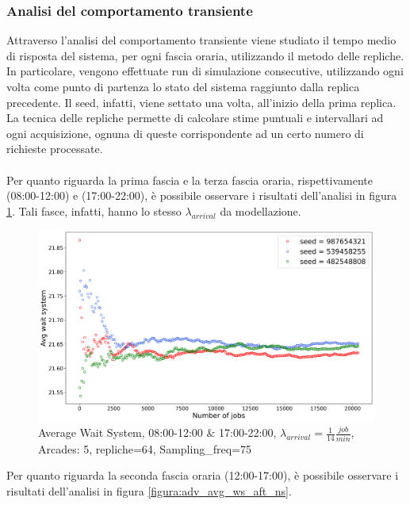 \documentclass{article}
\begin{document}
\subsubsection{Analisi del comportamento transiente}
Attraverso l'analisi del comportamento transiente viene studiato il tempo medio di risposta del sistema, per ogni fascia oraria, utilizzando il metodo delle repliche.
In particolare, vengono effettuate run di simulazione
consecutive, utilizzando ogni volta come punto di partenza lo stato del sistema raggiunto dalla replica precedente. Il seed, infatti, viene settato una volta, all'inizio della prima replica.
La tecnica delle repliche permette di calcolare stime puntuali e intervallari ad ogni acquisizione, ognuna di queste corrispondente ad un certo numero di richieste processate.
\\ \\
Per quanto riguarda la prima fascia e la terza fascia oraria, rispettivamente (08:00-12:00) e (17:00-22:00), è possibile osservare i risultati dell'analisi in figura \ref{figura:adv_avg_ws_mor_s}. Tali fasce, infatti, hanno lo stesso $\lambda_{arrival}$ da modellazione.

\begin{figure}[H]
\centering
\captionsetup{justification=centering,margin=2cm}
\includegraphics[scale=0.48]{images/adv_avg_ws_mor_s.png}
\caption{Average Wait System, 08:00-12:00 \& 17:00-22:00, $\lambda_{arrival}=\frac{1}{14} \frac{job}{min}$, Arcades: 5, repliche=64, Sampling\_freq=75}\label{figura:adv_avg_ws_mor_s}
\end{figure}


Per quanto riguarda la seconda fascia oraria (12:00-17:00), è possibile osservare i risultati dell'analisi in figura \ref{figura:adv_avg_ws_aft_ns}.
\end{document}
